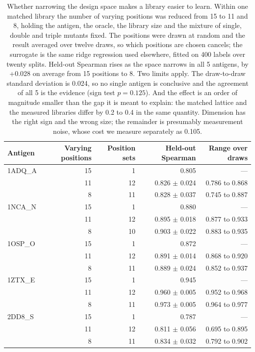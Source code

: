 \documentclass[11pt,a4paper]{article}
\begin{document}
\begin{table}[h]
\caption{Whether narrowing the design space makes a library easier to learn. Within one matched library the number of varying positions was reduced from 15 to 11 and 8, holding the antigen, the oracle, the library size and the mixture of single, double and triple mutants fixed. The positions were drawn at random and the result averaged over twelve draws, so which positions are chosen cancels; the surrogate is the same ridge regression used elsewhere, fitted on 400 labels over twenty splits. Held-out Spearman rises as the space narrows in all 5 antigens, by +0.028 on average from 15 positions to 8. Two limits apply. The draw-to-draw standard deviation is 0.024, so no single antigen is conclusive and the agreement of all 5 is the evidence (sign test $p = 0.125$). And the effect is an order of magnitude smaller than the gap it is meant to explain: the matched lattice and the measured libraries differ by 0.2 to 0.4 in the same quantity. Dimension has the right sign and the wrong size; the remainder is presumably measurement noise, whose cost we measure separately as 0.105.}
\centering
\begin{tabular}{@{}lrrrr@{}}
\toprule
Antigen & Varying positions & Position sets & Held-out Spearman & Range over draws \\
\midrule
1ADQ\_A & 15 & 1 & 0.805 & --- \\
 & 11 & 12 & 0.826 $\pm$ 0.024 & 0.786 to 0.868 \\
 & 8 & 11 & 0.828 $\pm$ 0.037 & 0.745 to 0.887 \\
\midrule
1NCA\_N & 15 & 1 & 0.880 & --- \\
 & 11 & 12 & 0.895 $\pm$ 0.018 & 0.877 to 0.933 \\
 & 8 & 10 & 0.903 $\pm$ 0.022 & 0.883 to 0.935 \\
\midrule
1OSP\_O & 15 & 1 & 0.872 & --- \\
 & 11 & 12 & 0.891 $\pm$ 0.014 & 0.868 to 0.920 \\
 & 8 & 11 & 0.889 $\pm$ 0.024 & 0.852 to 0.937 \\
\midrule
1ZTX\_E & 15 & 1 & 0.945 & --- \\
 & 11 & 12 & 0.960 $\pm$ 0.005 & 0.952 to 0.968 \\
 & 8 & 11 & 0.973 $\pm$ 0.005 & 0.964 to 0.977 \\
\midrule
2DD8\_S & 15 & 1 & 0.787 & --- \\
 & 11 & 12 & 0.811 $\pm$ 0.056 & 0.695 to 0.895 \\
 & 8 & 11 & 0.834 $\pm$ 0.032 & 0.792 to 0.902 \\
\bottomrule
\end{tabular}
\end{table}
\end{document}
